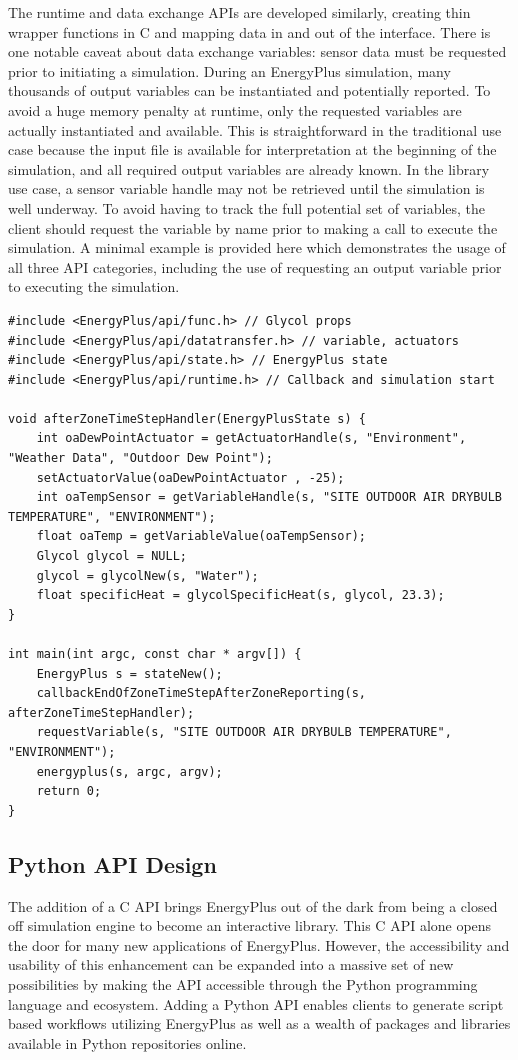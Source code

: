 \documentclass[5p]{elsarticle}
\begin{document}
The runtime and data exchange APIs are developed similarly, creating thin wrapper functions in C and mapping data in and out of the interface.  There is one notable caveat about data exchange variables: sensor data must be requested prior to initiating a simulation.  During an EnergyPlus simulation, many thousands of output variables can be instantiated and potentially reported.  To avoid a huge memory penalty at runtime, only the requested variables are actually instantiated and available.  This is straightforward in the traditional use case because the input file is available for interpretation at the beginning of the simulation, and all required output variables are already known.  In the library use case, a sensor variable handle may not be retrieved until the simulation is well underway.  To avoid having to track the full potential set of variables, the client should request the variable by name prior to making a call to execute the simulation.  A minimal example is provided here which demonstrates the usage of all three API categories, including the use of requesting an output variable prior to executing the simulation.  

\lstset{language=c}
\begin{lstlisting}
#include <EnergyPlus/api/func.h> // Glycol props
#include <EnergyPlus/api/datatransfer.h> // variable, actuators 
#include <EnergyPlus/api/state.h> // EnergyPlus state
#include <EnergyPlus/api/runtime.h> // Callback and simulation start

void afterZoneTimeStepHandler(EnergyPlusState s) {
    int oaDewPointActuator = getActuatorHandle(s, "Environment", "Weather Data", "Outdoor Dew Point");
    setActuatorValue(oaDewPointActuator , -25);
    int oaTempSensor = getVariableHandle(s, "SITE OUTDOOR AIR DRYBULB TEMPERATURE", "ENVIRONMENT");
    float oaTemp = getVariableValue(oaTempSensor);
    Glycol glycol = NULL;
    glycol = glycolNew(s, "Water");
    float specificHeat = glycolSpecificHeat(s, glycol, 23.3);
}

int main(int argc, const char * argv[]) {
    EnergyPlus s = stateNew();
    callbackEndOfZoneTimeStepAfterZoneReporting(s, afterZoneTimeStepHandler);
    requestVariable(s, "SITE OUTDOOR AIR DRYBULB TEMPERATURE", "ENVIRONMENT");
    energyplus(s, argc, argv);
    return 0;
}
\end{lstlisting}

  \subsection{Python API Design}
The addition of a C API brings EnergyPlus out of the dark from being a closed off simulation engine to become an interactive library.  This C API alone opens the door for many new applications of EnergyPlus. However, the accessibility and usability of this enhancement can be expanded into a massive set of new possibilities by making the API accessible through the Python programming language and ecosystem.  Adding a Python API enables clients to generate script based workflows utilizing EnergyPlus as well as a wealth of packages and libraries available in Python repositories online.
\end{document}
